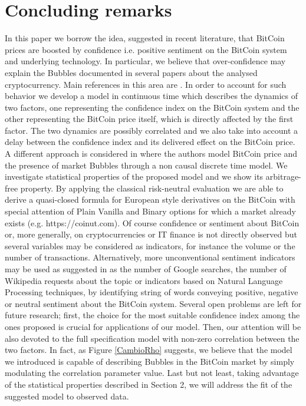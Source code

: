\documentclass[12pt,centertags,reqno]{amsart}
\numberwithin{equation}{section} \makeatletter
\begin{document}
\section{Concluding remarks}
In this paper we borrow the idea, suggested in recent literature, that BitCoin prices are boosted by confidence i.e. positive sentiment on the BitCoin system and underlying technology. In particular, we believe that over-confidence may explain the Bubbles documented in several papers about the analysed cryptocurrency. Main references in this area are \citet{MainDrivers, GoogleTrends, SentimentAnalysis,bukovina2016sentiment}. In order to account for such behavior we develop a model in continuous time which describes the dynamics of two factors, one representing the confidence index on the BitCoin system and the other representing the BitCoin price itself, which is directly affected by the first factor.  The two dynamics are possibly correlated and we also take into account a delay between the confidence index and its delivered effect on the BitCoin price. 
A different approach is considered in \citet{HencGou}  where the authors  model BitCoin price and the presence of  market Bubbles through a non causal discrete time model.
We investigate statistical properties of the proposed model and we %
show its arbitrage-free property. By applying the classical risk-neutral evaluation we are able to derive a quasi-closed formula for European style derivatives on the BitCoin with special attention of Plain Vanilla and Binary options for which a market already exists (e.g. https://coinut.com). 
Of course confidence or sentiment about BitCoin or, more generally, on cryptocurrencies or IT finance is not directly observed  but several variables may be considered as indicators, for instance the volume or the number of transactions. Alternatively, more unconventional sentiment indicators may be used as suggested in \citet{GoogleTrends, SentimentAnalysis,bukovina2016sentiment} as the number of Google searches, the number of Wikipedia requests about the topic or indicators  based on Natural Language Processing techniques,  by identifying string of words conveying positive, negative or neutral sentiment about the BitCoin system.
Several open problems are left for future research; first, the choice for the most suitable confidence index among the ones proposed is crucial for applications of our model.
Then, our attention will be also devoted to the full specification model with non-zero correlation between the two factors. In fact, as Figure \ref{CambioRho} suggests, we believe that the model we introduced is capable of describing Bubbles in the BitCoin market by simply modulating the correlation parameter value. 
Last but not least, taking advantage of the statistical properties described in Section 2, we will address the fit of the suggested model to observed data.
\end{document}
